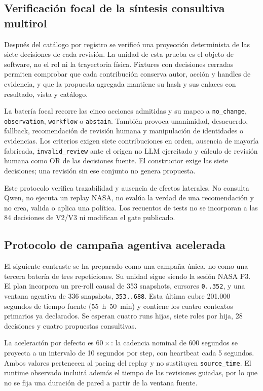 \subsection{Verificación focal de la síntesis consultiva multirol}

Después del catálogo por registro se verificó una proyección determinista de las
siete decisiones de cada revisión. La unidad de esta prueba es el objeto de
software, no el rol ni la trayectoria física. Fixtures con decisiones cerradas
permiten comprobar que cada contribución conserva autor, acción y handles de
evidencia, y que la propuesta agregada mantiene su hash y sus enlaces con
resultado, vista y catálogo.

La batería focal recorre las cinco acciones admitidas y su mapeo a
\texttt{no\_change}, \texttt{observation}, \texttt{workflow} o
\texttt{abstain}. También provoca unanimidad, desacuerdo, fallback,
recomendación de revisión humana y manipulación de identidades o evidencias.
Los criterios exigen siete contribuciones en orden, ausencia de mayoría
fabricada, \texttt{invalid\_review} ante el origen no LLM ejercitado y cálculo
de revisión humana como OR de las decisiones fuente. El constructor exige las
siete decisiones; una revisión sin ese conjunto no genera propuesta.

Este protocolo verifica trazabilidad y ausencia de efectos laterales. No
consulta Qwen, no ejecuta un replay NASA, no evalúa la verdad de una
recomendación y no crea, valida o aplica una política. Los recuentos de tests no
se incorporan a las 84 decisiones de V2/V3 ni modifican el gate publicado.

\subsection{Protocolo de campaña agentiva acelerada}

El siguiente contraste se ha preparado como una campaña única, no como una
tercera batería de tres repeticiones. Su unidad sigue siendo la sesión NASA P3.
El plan incorpora un pre-roll causal de 353 snapshots, cursores
\texttt{0..352}, y una ventana agentiva de 336 snapshots,
\texttt{353..688}. Esta última cubre 201.000 segundos de tiempo fuente
(55~h~50~min) y contiene los cuatro contextos primarios ya declarados. Se
esperan cuatro runs hijas, siete roles por hija, 28 decisiones y cuatro
propuestas consultivas.

La aceleración por defecto es $60\times$: la cadencia nominal de 600 segundos se
proyecta a un intervalo de 10 segundos por step, con heartbeat cada 5 segundos.
Ambos valores pertenecen al pacing del replay y no sustituyen
\texttt{source\_time}. El runtime observado incluirá además el tiempo de las
revisiones guiadas, por lo que no se fija una duración de pared a partir de la
ventana fuente.

